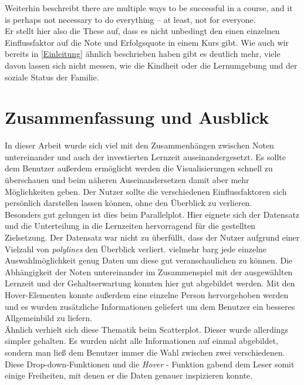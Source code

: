 \documentclass[usegeometry=true]{scrartcl}
\begin{document}
\noindent Weiterhin beschreibt \cite{Xu14}\: \glqq [...] there are multiple ways to be
successful in a course, and it is perhaps not necessary to do
everything – at least, not for everyone\grqq .\\
Er stellt hier also die These auf, dass es nicht unbedingt den einen einzelnen Einflussfaktor auf die Note und Erfolgsquote in einem Kurs gibt. Wie auch wir bereits in \ref{Einleitung} ähnlich beschrieben haben gibt es deutlich mehr, viele davon lassen sich nicht messen, wie die Kindheit oder die Lernumgebung und der soziale Status der Familie.





\section{Zusammenfassung und Ausblick}
In dieser Arbeit wurde sich viel mit den Zusammenhängen zwischen Noten untereinander und auch der investierten Lernzeit auseinandergesetzt. Es sollte dem Benutzer außerdem ermöglicht werden die Visualisierungen schnell zu überschauen und beim näheren Auseinandersetzen damit aber mehr Möglichkeiten geben. Der Nutzer sollte die verschiedenen Einflussfaktoren sich persönlich darstellen lassen können, ohne den Überblick zu verlieren.\\

\noindent Besonders gut gelungen ist dies beim Parallelplot. Hier eignete sich der Datensatz und die Unterteilung in die Lernzeiten hervorragend für die gestellten Zielsetzung. Der Datensatz war nicht zu überfüllt, dass der Nutzer aufgrund einer Vielzahl von \textit{polylines} den Überblick verliert. vielmehr barg jede einzelne Auswahlmöglichkeit genug Daten um diese gut veranschaulichen zu können. Die Abhängigkeit der Noten untereinander im Zusammenspiel mit der ausgewählten Lernzeit und der Gehaltserwartung konnten hier gut abgebildet werden. Mit den Hover-Elementen konnte außerdem eine einzelne Person hervorgehoben werden und es wurden zusätzliche Informationen geliefert um dem Benutzer ein besseres Allgemeinbild zu liefern.\\

\noindent  Ähnlich verhielt sich diese Thematik beim Scatterplot. Dieser wurde allerdings simpler gehalten. Es wurden nicht alle Informationen auf einmal abgebildet, sondern man ließ dem Benutzer immer die Wahl zwischen zwei verschiedenen. Diese Drop-down-Funktionen und die \textit{Hover} - Funktion gabend dem Leser somit einige Freiheiten, mit denen er die Daten genauer inspizieren konnte.\\
\end{document}
